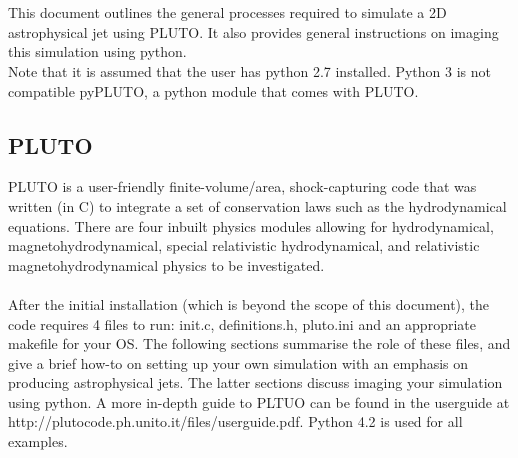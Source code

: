 \documentclass[12pt,a4paper]{report}
\begin{document}
\maketitle

\chapter{} This document outlines the general processes required to simulate a 2D astrophysical jet using PLUTO. It also provides general instructions on imaging this simulation using python. \\
\newline
Note that it is assumed that the user has python 2.7 installed. Python 3 is not compatible pyPLUTO, a python module that comes with PLUTO.
\section{PLUTO}

PLUTO is a user-friendly finite-volume/area, shock-capturing code that was written (in C) to integrate a set of conservation laws such as the hydrodynamical equations. There are four inbuilt physics modules allowing for hydrodynamical, magnetohydrodynamical, special relativistic hydrodynamical, and relativistic magnetohydrodynamical physics to be investigated.\\
\\
After the initial installation (which is beyond the scope of this document), the code requires 4 files to run: init.c, definitions.h, pluto.ini and an appropriate makefile for your OS. The following sections summarise the role of these files, and give a brief how-to on setting up your own simulation with an emphasis on producing astrophysical jets. The latter sections discuss imaging your simulation using python. A more in-depth guide to PLTUO can be found in the userguide at http://plutocode.ph.unito.it/files/userguide.pdf. Python 4.2 is used for all examples.
\end{document}
